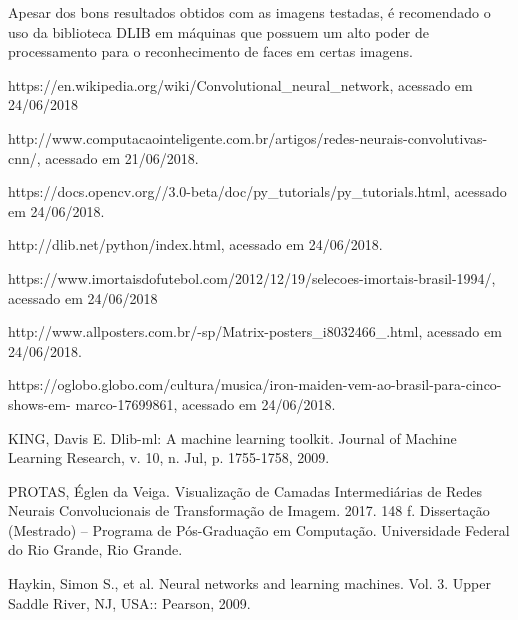 \documentclass[conference]{IEEEtran}
\begin{document}
         Apesar dos bons resultados obtidos com as imagens testadas, é recomendado o uso da biblioteca DLIB em máquinas que possuem um alto poder de processamento para o reconhecimento de faces em certas imagens.
      
         
	  \begin{thebibliography}{00}

		 https://en.wikipedia.org/wiki/Convolutional\_neural\_network, acessado em 24/06/2018	  
	  		
		 http://www.computacaointeligente.com.br/artigos/redes-neurais-convolutivas-cnn/, acessado em 		        21/06/2018.
		
		 https://docs.opencv.org//3.0-beta/doc/py\_tutorials/py\_tutorials.html, acessado em 24/06/2018.
		
		 http://dlib.net/python/index.html, acessado em 24/06/2018.
		
		 https://www.imortaisdofutebol.com/2012/12/19/selecoes-imortais-brasil-1994/, acessado em                                                                   		24/06/2018
		
		 http://www.allposters.com.br/-sp/Matrix-posters\_i8032466\_.html, acessado em 24/06/2018.

		 https://oglobo.globo.com/cultura/musica/iron-maiden-vem-ao-brasil-para-cinco-shows-em-						marco-17699861, acessado em 24/06/2018.
		
		 KING, Davis E. Dlib-ml: A machine learning toolkit. Journal of Machine Learning Research, v. 10, 			n. Jul, p. 1755-1758, 2009.
		
		 PROTAS, Églen da Veiga. Visualização de Camadas Intermediárias de Redes Neurais
		Convolucionais de Transformação de Imagem. 2017. 148 f. Dissertação (Mestrado) –
		Programa de Pós-Graduação em Computação. Universidade Federal do Rio Grande, Rio
		Grande.
		
		 Haykin, Simon S., et al. Neural networks and learning machines. Vol. 3. Upper Saddle River, NJ, 			USA:: Pearson, 2009.
		
	  \end{thebibliography}
\end{document}
